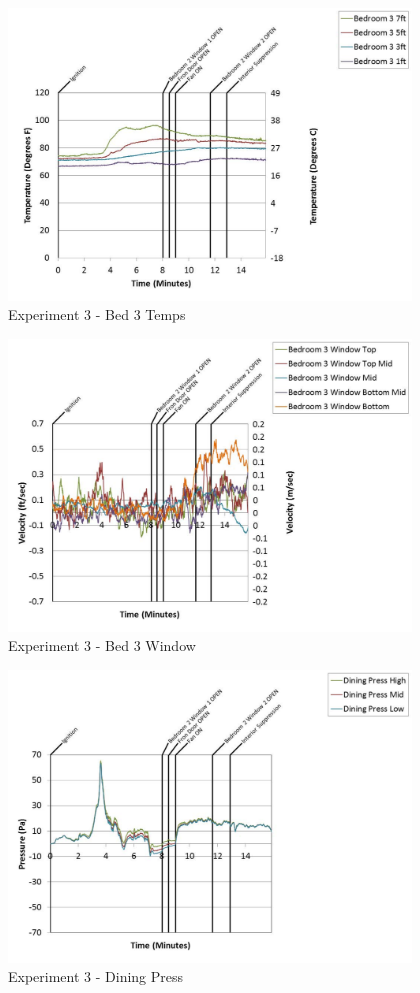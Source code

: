 \documentclass{article}
\begin{document}
\begin{appendices}
	\begin{figure}[h!]
		\centering
		\includegraphics[height=3.05in]{0_Images/Results_Charts/Exp_3_Charts/Bed3Temps.pdf}
		\caption{Experiment 3 - Bed 3 Temps}
	\end{figure}
 
	\clearpage

	\begin{figure}[h!]
		\centering
		\includegraphics[height=3.05in]{0_Images/Results_Charts/Exp_3_Charts/Bed3Window.pdf}
		\caption{Experiment 3 - Bed 3 Window}
	\end{figure}
 

	\begin{figure}[h!]
		\centering
		\includegraphics[height=3.05in]{0_Images/Results_Charts/Exp_3_Charts/DiningPress.pdf}
		\caption{Experiment 3 - Dining Press}
	\end{figure}
 

\end{appendices}
\end{document}

